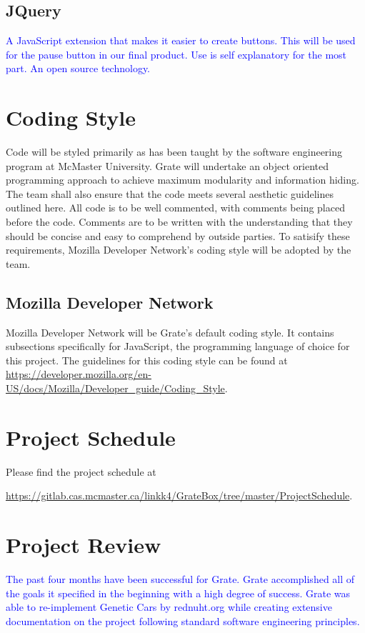 \documentclass{article}
\begin{document}
\subsection{JQuery}
\textcolor{blue}{
A JavaScript extension that makes it easier to create buttons. This will be used for the pause button in our final product. Use is self explanatory for the most part. An open source technology.}

\section{Coding Style}

Code will be styled primarily as has been taught by the software engineering 
program at McMaster University. Grate will undertake an object oriented 
programming approach to achieve maximum modularity and information hiding. The 
team shall also ensure that the code meets several aesthetic guidelines outlined 
here. All code is to be well commented, with comments being placed before the 
code. Comments are to be written with the understanding that they should be 
concise and easy to comprehend by outside parties. To satisify these 
requirements, Mozilla Developer Network's coding style will be adopted by the 
team. 

\subsection{Mozilla Developer Network}

Mozilla Developer Network will be Grate's default coding style. It contains 
subsections specifically for JavaScript, the programming language of choice for 
this project.  The guidelines for this coding style can be found at
\href{https://developer.mozilla.org/en-US/docs/Mozilla/Developer\_guide/Coding\_Style}{https://developer.mozilla.org/en-US/docs/Mozilla/Developer\_guide/Coding\_Style}.

\section{Project Schedule}
Please find the project schedule at 

\href{https://gitlab.cas.mcmaster.ca/linkk4/GrateBox/tree/master/ProjectSchedule} 
{https://gitlab.cas.mcmaster.ca/linkk4/GrateBox/tree/master/ProjectSchedule}.

\section{Project Review}
\textcolor{blue}{The past four months have been successful for Grate. Grate accomplished all of 
the goals it specified in the beginning with a high degree of success. Grate was 
able to re-implement Genetic Cars by rednuht.org while creating extensive 
documentation on the project following standard software engineering principles.}
\end{document}

